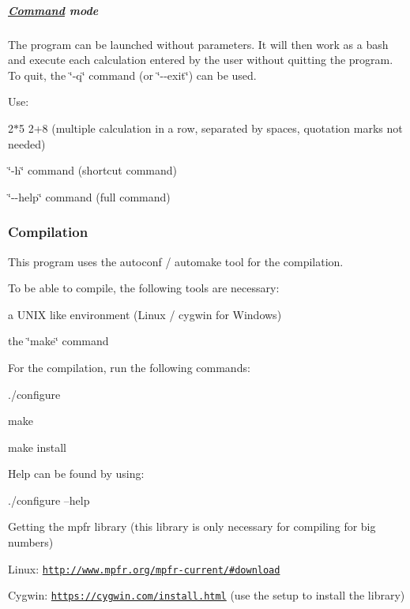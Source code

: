 \subparagraph*{\hyperlink{class_command}{Command} mode}

The program can be launched without parameters. It will then work as a bash and execute each calculation entered by the user without quitting the program. To quit, the \char`\"{}-\/q\char`\"{} command (or \char`\"{}-\/-\/exit\char`\"{}) can be used.
\begin{DoxyItemize}
\item Use\+:
\begin{DoxyItemize}
\item 2$\ast$5 2+8 (multiple calculation in a row, separated by spaces, quotation marks not needed)
\item \char`\"{}-\/h\char`\"{} command (shortcut command)
\item \char`\"{}-\/-\/help\char`\"{} command (full command)
\end{DoxyItemize}
\end{DoxyItemize}

\subsubsection*{Compilation}


\begin{DoxyItemize}
\item This program uses the autoconf / automake tool for the compilation.
\item To be able to compile, the following tools are necessary\+:
\begin{DoxyItemize}
\item a U\+N\+I\+X like environment (Linux / cygwin for Windows)
\item the \char`\"{}make\char`\"{} command
\end{DoxyItemize}
\item For the compilation, run the following commands\+:
\begin{DoxyItemize}
\item ./configure
\item make
\item make install
\end{DoxyItemize}
\item Help can be found by using\+:
\begin{DoxyItemize}
\item ./configure --help
\end{DoxyItemize}
\item Getting the mpfr library (this library is only necessary for compiling for big numbers)
\begin{DoxyItemize}
\item Linux\+: \href{http://www.mpfr.org/mpfr-current/#download}{\tt http\+://www.\+mpfr.\+org/mpfr-\/current/\#download}
\item Cygwin\+: \href{https://cygwin.com/install.html}{\tt https\+://cygwin.\+com/install.\+html} (use the setup to install the library)
\end{DoxyItemize}
\end{DoxyItemize}

